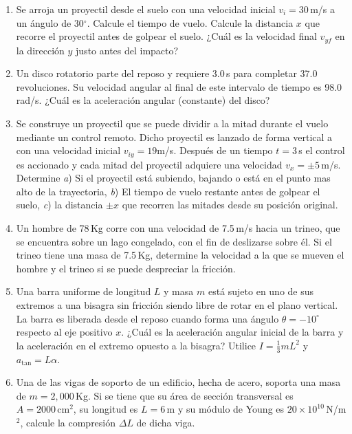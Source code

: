 \documentclass{article}
\begin{document}
\begin{enumerate}

\item Se arroja un proyectil desde el suelo con una velocidad inicial
$v_{i}=30$\,m/s a un \'angulo de 30$^{\circ}$. Calcule el tiempo de vuelo.
Calcule la distancia $x$ que recorre el proyectil antes de golpear el suelo.
¿Cuál es la velocidad final $v_{yf}$ en la dirección $y$ justo antes del
impacto?

\item Un disco rotatorio parte del reposo y requiere 3.0\,s para completar 37.0
revoluciones. Su velocidad angular al final de este intervalo de tiempo es
98.0\,rad/s. ¿Cuál es la aceleración angular (constante) del disco?

\item Se construye un proyectil que se puede dividir a la mitad durante el
vuelo mediante un control remoto. Dicho proyectil es lanzado de forma vertical
a con una velocidad inicial $v_{iy}=19$m/s. Después de un tiempo $t=3$\,s el
control es accionado y cada mitad del proyectil adquiere una velocidad $v_{x} =
\pm5$\,m/s. Determine \emph{a}) Si el proyectil está subiendo, bajando o está
en el punto mas alto de la trayectoria, \emph{b}) El tiempo de vuelo restante
antes de golpear el suelo, \emph{c}) la distancia $\pm x$ que recorren las
mitades desde su posición original.

\item Un hombre de 78\,Kg corre con una velocidad de 7.5\,m/s hacia un trineo, 
que se encuentra sobre un lago congelado, con el fin de deslizarse sobre él. Si
el trineo tiene una masa de 7.5\,Kg, determine la velocidad a la que se mueven
el hombre y el trineo si se puede despreciar la fricción.

\item Una barra uniforme de longitud $L$ y masa $m$ está sujeto en uno de sus
extremos a una bisagra sin fricción siendo libre de rotar en el plano vertical.
La barra es liberada desde el reposo cuando forma una ángulo $\theta =
-10^{\circ}$  respecto al eje positivo $x$. ¿Cuál es la aceleración angular
inicial de la barra y la aceleración en el extremo opuesto a la bisagra?
Utilice $I= \frac{1}{3}mL^{2}$ y $a_{\tan} = L \alpha$.

\item Una de las vigas de soporto de un edificio, hecha de acero, soporta una
masa de $m=2,000$\,Kg. Si se tiene que su área de sección transversal es
$A=2000\,\text{cm}^{2}$, su longitud es $L=6$\,m y su módulo de Young es $20
\times 10^{10}$\,N/m$^{2}$, calcule la compresión $\Delta L$ de dicha viga.

\end{enumerate}
\end{document}

